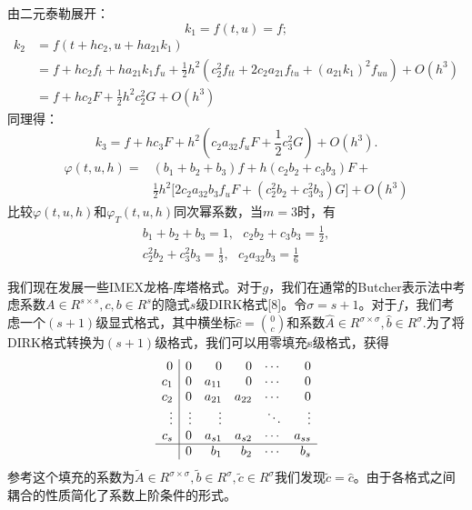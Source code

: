 \documentclass[12pt,a4paper]{article}
\begin{document}
由二元泰勒展开：
\begin{equation*}
k_{1}=f(t,u)=f;
\end{equation*}
\begin{align*}
k_{2}&=f(t+hc_{2},u+ha_{21}k_{1})\\
&=f+hc_{2}f_{t}+ha_{21}k_{1}f_{u}+\frac{1}{2}h^2(c_{2}^2f_{tt}+2c_{2}a_{21}f_{tu}+(a_{21}k_{1})^2f_{uu})+O(h^3)\\
&=f+hc_{2}F+\frac{1}{2}h^2c_{2}^2G+O(h^3)
\end{align*}
同理得：
\begin{equation*}
k_{3}=f+hc_{3}F+h^2(c_{2}a_{32}f_{u}F+\frac{1}{2}c_{3}^2G)+O(h^3).
\end{equation*}
\begin{align*}
\varphi(t,u,h)=&(b_{1}+b_{2}+b_{3})f+h(c_{2}b_{2}+c_{3}b_{3})F+\\
&\frac{1}{2}h^2\biggl[2c_{2}a_{32}b_{3}f_{u}F+(c_{2}^2b_{2}+c_{3}^2b_{3})G\biggr]+O(h^3)
\end{align*}
比较$\varphi(t,u,h)$和$\varphi_{T}(t,u,h)$同次幂系数，当$m=3$时，有
\begin{gather*}
b_{1}+b_{2}+b_{3}=1,~~~c_{2}b_{2}+c_{3}b_{3}=\frac{1}{2},\\
c_{2}^2b_{2}+c_{3}^2b_{3}=\frac{1}{3},~~~c_{2}a_{32}b_{3}=\frac{1}{6}
\end{gather*}



我们现在发展一些IMEX龙格-库塔格式。对于$g$，我们在通常的Butcher表示法中考虑系数$A\in R^{s\times s} ,c,b\in R^s$的隐式$s$级DIRK格式[8]。令$\sigma=s+1$。对于$f$，我们考虑一个$(s+1)$级显式格式，其中横坐标$\widehat{c}=\binom{0}{c}$和系数$\widehat{A}\in R^{\sigma\times \sigma},\widehat{b}\in
R^{\sigma}.$为了将DIRK格式转换为$(s+1)$级格式，我们可以用零填充s级格式，获得
\[
\begin{array}{r|r r r r  r}
0 &  0 & 0 & 0  & \cdots & 0 \\
c_{1} & 0 & a_{11} & 0 & \cdots & 0 \\
c_{2} & 0 & a_{21} & a_{22} & \cdots & 0 \\
\vdots & \vdots &  \vdots &  &  \ddots &  \vdots \\
c_{s} & 0 & a_{s1} & a_{s2} & \cdots & a_{ss} \\
\hline
 & 0 & b_{1} & b_{2} & \cdots & b_{s} 
\end{array}
\]
参考这个填充的系数为$\tilde{A}\in R^{\sigma\times\sigma},\tilde{b}\in R^{\sigma},\tilde{c}\in R^{\sigma}$我们发现$\tilde{c}=\widehat{c}$。由于各格式之间耦合的性质简化了系数上阶条件的形式。
\end{document}
